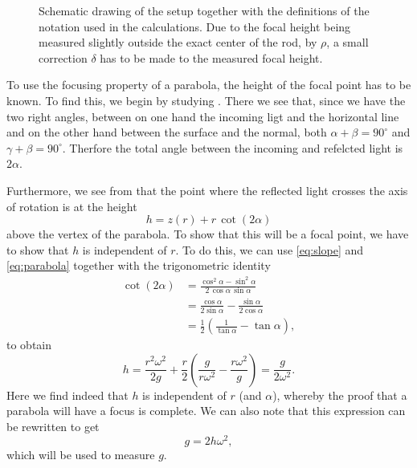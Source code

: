 \documentclass[11pt, a4paper, twocolumn, swedish, english]{article}
\begin{document}
\begin{figure}
\centering
\resizebox{.6\linewidth}{!}{}
\caption{Schematic drawing of the setup together with the definitions
  of the notation used in the calculations. Due to the focal height
  being measured slightly outside the exact center of the rod, by
  $\rho$, a small correction $\delta$ has to be made to the measured
  focal height.} 
\label{fig:rot_bowl} 
\end{figure}

To use the focusing property of a parabola, the height of the
focal point has to be known. To find this, we begin by studying
. There we see that, since we have the two right
angles, between on one hand the incoming ligt and the horizontal line
and on the other hand between the surface and the normal, both
$\alpha+\beta = 90^\circ$ and $\gamma+\beta = 90^\circ$. Therfore the
total angle between the incoming and refelcted light is $2\alpha$. 

Furthermore, we see from  that the point where the
reflected light crosses the axis of rotation is at the height 
\begin{equation}
h= z(r) + r\,\cot(2\alpha)
\end{equation}
above the vertex of the parabola.
To show that this will be a focal point, we have to show that $h$ is
independent of $r$. To do this, we can use \eqref{eq:slope} and
\eqref{eq:parabola} together with the trigonometric identity
\begin{equation}
\begin{aligned}
\cot(2\alpha)
&=\frac{\cos^2\alpha-\sin^2\alpha}{2\,\cos\alpha\,\sin\alpha}\\
&=\frac{\cos\alpha}{2\sin\alpha}-\frac{\sin\alpha}{2\cos\alpha}\\
&=\frac{1}{2}\left(\frac{1}{\tan\alpha} -\tan\alpha \right),
\end{aligned}
\end{equation}
to obtain
\begin{equation}
h=\frac{r^2\omega^2}{2g} 
   + \frac{r}{2}\left(\frac{g}{r\omega^2} -\frac{r\omega^2}{g} \right)
=\frac{g}{2\omega^2}.
\end{equation}
Here we find indeed that $h$ is independent of $r$ (and $\alpha$),
whereby the proof that a parabola will have a focus is complete. We
can also note that this expression can be rewritten to get
\begin{equation}
g=2h\omega^2,
\end{equation}
which will be used to measure $g$. 
\end{document}
